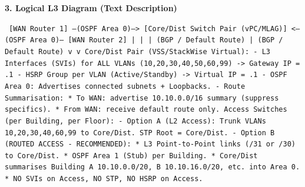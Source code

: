 \documentclass[11pt]{article}
\begin{document}
\begin{exoresolu}
\noindent\textbf{3. Logical L3 Diagram (Text Description)}
\begin{flushleft}
\texttt{
[WAN Router 1] --(OSPF Area 0)--> [Core/Dist Switch Pair (vPC/MLAG)] <--(OSPF Area 0)-- [WAN Router 2]\newline
       |                                                              |\newline
       | (BGP / Default Route)                                        | (BGP / Default Route)\newline
       v                                                              v\newline
\newline
Core/Dist Pair (VSS/StackWise Virtual):\newline
  - L3 Interfaces (SVIs) for ALL VLANs (10,20,30,40,50,60,99) -> Gateway IP = .1\newline
  - HSRP Group per VLAN (Active/Standby) -> Virtual IP = .1\newline
  - OSPF Area 0: Advertises connected subnets + Loopbacks.\newline
  - Route Summarisation: \newline
      * To WAN: advertise 10.10.0.0/16 summary (suppress specifics).\newline
      * From WAN: receive default route only.\newline
\newline
Access Switches (per Building, per Floor):\newline
  - Option A (L2 Access): Trunk VLANs 10,20,30,40,60,99 to Core/Dist. STP Root = Core/Dist.\newline
  - Option B (ROUTED ACCESS - RECOMMENDED): \newline
      * L3 Point-to-Point links (/31 or /30) to Core/Dist.\newline
      * OSPF Area 1 (Stub) per Building.\newline
      * Core/Dist summarises Building A 10.10.0.0/20, B 10.10.16.0/20, etc. into Area 0.\newline
      * NO SVIs on Access, NO STP, NO HSRP on Access.
}
\end{flushleft}


\end{exoresolu}
\end{document}
